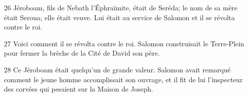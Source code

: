 26 Jéroboam, fils de Nebath l’Éphraïmite, était de Seréda; le nom de sa mère était Seroua; elle était veuve. Lui était au service de Salomon et il se révolta contre le roi.

27 Voici comment il se révolta contre le roi. Salomon construisait le Terre-Plein pour fermer la brèche de la Cité de David son père.

28 Ce Jéroboam était quelqu’un de grande valeur. Salomon avait remarqué comment le jeune homme accomplissait son ouvrage, et il fit de lui l’inspecteur des corvées qui pesaient sur la Maison de Joseph.
